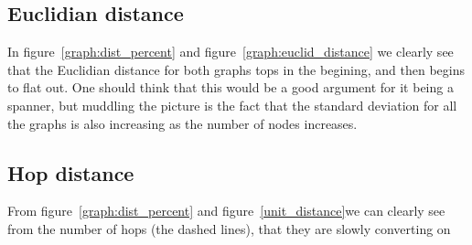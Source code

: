 \subsection{Euclidian distance}

In figure~\ref{graph:dist_percent} and figure~\ref{graph:euclid_distance} we clearly see that the Euclidian distance for both graphs tops in the begining, and then begins to flat out. One should think that this would be a good argument for it being a spanner, but muddling the picture is the fact that the standard deviation for all the graphs is also increasing as the number of nodes increases.  

\subsection{Hop distance}


From figure~\ref{graph:dist_percent} and figure~\ref{unit_distance}we can clearly see from the number of hops (the dashed lines), that they are slowly converting on 

\subsection{}
